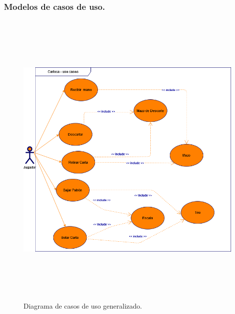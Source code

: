 \subsubsection{Modelos de casos de uso.}\label{cap:modelos-casos-uso}
\begin{figure}[H]
    \centering
    \includegraphics[height=15cm, width=15cm]{imagenes/diagramas/casosdeuso.png}
    \caption{Diagrama de casos de uso generalizado.}
\end{figure}
